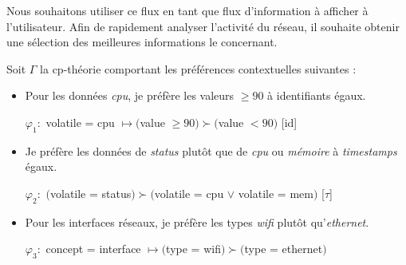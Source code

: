 Nous souhaitons utiliser ce flux en tant que flux d'information à afficher à l'utilisateur. Afin de rapidement analyser l'activité du réseau, il souhaite obtenir une sélection des meilleures informations le concernant.

Soit $\Gamma$ la cp-théorie comportant les préférences contextuelles suivantes :
\begin{itemize}
	\item Pour les données \textit{cpu}, je préfère les valeurs $\geq 90$ à identifiants égaux.
	
	\qquad $\varphi_1 : $ volatile = cpu $\mapsto ($value $ \geq 90) \succ ($value $ < 90)$ [id]
	\item Je préfère les données de \textit{status} plutôt que de \textit{cpu} ou \textit{mémoire} à \textit{timestamps} égaux.
	
	\qquad $\varphi_2 : $ $($volatile = status$) \succ ($volatile = cpu $ \vee $ volatile = mem$)$ [$\tau$]
	\item Pour les interfaces réseaux, je préfère les types \textit{wifi} plutôt qu'\textit{ethernet}.
	
	\qquad $\varphi_3 : $ concept = interface $\mapsto ($type = wifi$) \succ ($type = ethernet$)$
\end{itemize}

